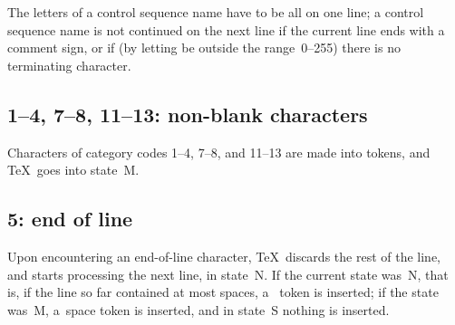 \documentclass{book}
\begin{document}
The letters of a control sequence name have to be all on one line;
a control sequence name is not continued on the next line
if the current line ends with a comment sign, or if (by letting
 be outside the range~0--255) 
there is no terminating character.

\subsection{1--4, 7--8, 11--13: non-blank characters}

Characters of category codes 1--4, 7--8, and 11--13 are made
into tokens, and \TeX\ goes into state~{\italic M}.

\subsection{5: end of line}

Upon encountering an end-of-line character, 
\TeX\ discards the rest of the
line, and starts processing the next line,
in state~{\italic N}. If the current state was~{\italic N},
that is, if the
line so far contained at most spaces, a~ token
is inserted; if the state was~{\italic M}, a~space token is inserted,
and in state~{\italic S} nothing is inserted.
\end{document}
